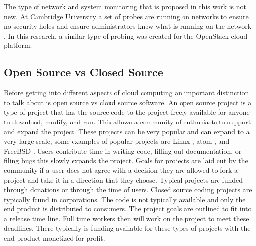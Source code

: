 \documentclass[12pt]{article}
\begin{document}
The type of network and system monitoring that is proposed in this work is not new. At Cambridge University a set of probes are running on networks to ensure no security holes and ensure administrators know what is running on the network \cite{CambUni}. In this research, a similar type of probing was created for the OpenStack cloud platform.

\subsection{Open Source vs Closed Source}
Before getting into different aspects of cloud computing an important distinction to talk about is open source vs cloud source software. An open source project is a type of project that has the source code to the project freely available for anyone to download, modify, and run. This allows a community of enthusiasts to support and expand the project. These projects can be very popular and can expand to a very large scale, some examples of popular projects are Linux \cite{Linux}, atom \cite{atom}, and FreeBSD \cite{freebsd}. Users contribute time in writing code, filling out documentation, or filing bugs this slowly expands the project. Goals for projects are laid out by the community if a user does not agree with a decision they are allowed to fork a project and take it in a direction that they choose.  Typical projects are funded through donations or through the time of users.  Closed source coding projects are typically found in corporations. The code is not typically available and only the end product is distributed to consumers. The project goals are outlined to fit into a release time line. Full time workers then will work on the project to meet these deadlines. There typically is funding available for these types of projects with the end product monetized for profit.
\end{document}
